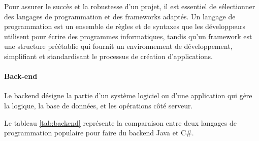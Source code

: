 \documentclass[12pt]{report}
\begin{document}
				\hspace{15pt} Pour assurer le succès et la robustesse d'un projet, il est essentiel de sélectionner des langages de programmation et des frameworks adaptés. Un langage de programmation est un ensemble de règles et de syntaxes que les développeurs utilisent pour écrire des programmes informatiques, tandis qu'un framework est une structure préétablie qui fournit un environnement de développement, simplifiant et standardisant le processus de création d'applications.


				\paragraph{Back-end}
				
				Le backend désigne la partie d'un système logiciel ou d'une application qui gère la logique, la base de données, et les opérations côté serveur.

				Le tableau \ref{tab:backend} représente la comparaison entre deux langages de programmation populaire pour faire du backend Java et C\#.
				
\end{document}
